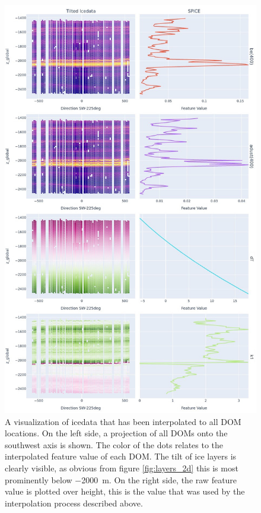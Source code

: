\documentclass[a4paper,10pt]{scrartcl}
\begin{document}
\begin{figure}[H]
    \includegraphics[scale=0.40]{images/feature_2d.jpg}
    \centering
    \caption{
        A visualization of icedata that has been interpolated to all DOM locations.
        On the left side, a projection of all DOMs onto the southwest axis is shown.
        The color of the dots relates to the interpolated feature value of each DOM.
        The tilt of ice layers is clearly visible, as obvious from figure \ref{fig:layers_2d} this is most prominently below \SI{-2000}{m}.
        On the right side, the raw feature value is plotted over height, this is the value that was used by the interpolation process described above.
    }
    \label{fig:features_2d}
\end{figure}
\end{document}
